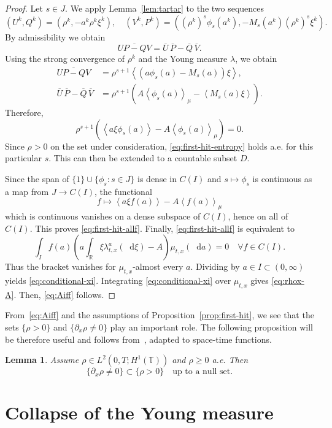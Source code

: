 \documentclass[a4paper,twosided,11pt]{article}
\newcommand{\R}{\mathbb{R}}
\newcommand{\T}{\mathbb{T}}
\newcommand{\la}{\lambda}
\newcommand{\av}[1]{\left\langle #1 \right\rangle}
\newcommand{\avmu}[1]{\left\langle #1 \right\rangle_{\mu}}
\newcommand{\1}{\mathbf{1}}
\theoremstyle{plain}
\newtheorem{lemma}[thm]{Lemma}
\theoremstyle{remark}
\newcommand{\diff}{\mathop{} \mathrm{d}}
\numberwithin{equation}{section}
\begin{document}
\begin{proof}
Let $s\in J$. We apply Lemma~\ref{lem:tartar} to the two sequences
$$
 (U^k,Q^k)=\left(\rho^k,-a^k\rho^k\xi^k\right),
 \quad
 (V^k,P^k)=\left((\rho^k)^s\phi_s(a^k),-M_s(a^k)(\rho^k)^s\xi^k\right).
$$
By admissibility we obtain
$$
 \overline{U P-Q V}=\overline U\, \overline P-\overline Q\, \overline V.
$$
Using the strong convergence of $\rho^k$ and the Young measure $\la$, we obtain 
\begin{align*}
 \overline{U P-Q V}
 &=\rho^{s+1}\av{(a\phi_s(a)-M_s(a))\xi},\\
 \overline U\, \overline P-\overline Q\, \overline V
 &=\rho^{s+1}\left(A \avmu{\phi_s(a)}-\av{M_s(a)\xi}\right).
\end{align*}
Therefore,
$$
 \rho^{s+1}\left(\av{a\xi \phi_s(a)}-A \avmu{\phi_s(a)}\right)=0.
$$
Since $\rho>0$ on the set under consideration, \eqref{eq:first-hit-entropy} holds a.e. for this particular $s$. This can then be extended to a countable subset $D$.

Since the span of $\{1\}\cup\{\phi_s:s\in J\}$ is dense in $C(I)$ and $s\mapsto \phi_s$ is continuous as a map from $J\to C(I)$, the functional
$$
 f\mapsto \av{a\xi f(a)}-A \avmu{f(a)}
$$
which is continuous vanishes on a dense subspace of $C(I)$, hence on all of $C(I)$. This proves \eqref{eq:first-hit-allf}. Finally, \eqref{eq:first-hit-allf} is equivalent to
$$
 \int_I f(a)\left(a\int_{\R}\xi \la^a_{t,x}(\diff\xi)-A\right)\mu_{t,x}(\diff a)=0
 \quad \forall f\in C(I).
$$
Thus the bracket vanishes for $\mu_{t,x}$-almost every $a$. Dividing by $a\in I\subset (0,\infty)$ yields \eqref{eq:conditional-xi}. Integrating \eqref{eq:conditional-xi} over $\mu_{t,x}$ gives \eqref{eq:rhox-A}. Then, \eqref{eq:Aiff} follows.
\end{proof}

From~\eqref{eq:Aiff} and the assumptions of Proposition~\ref{prop:first-hit}, we see that the sets $\{\rho>0\}$ and $\{\partial_x\rho\ne 0\}$ play an important role.  The following proposition will be therefore useful and follows from~\cite[Chapter 6]{MR1158660}, adapted to space-time functions.

\begin{lemma}\label{lem:vacuum-gradient}
Assume $\rho\in L^2(0,T;H^1(\T))$ and $\rho\ge 0$ a.e. Then
$$
\{\partial_x\rho\neq 0\}\subset \{\rho>0\}
\quad\text{up to a null set.}
$$
\end{lemma}


\section{Collapse of the Young measure}
\end{document}
